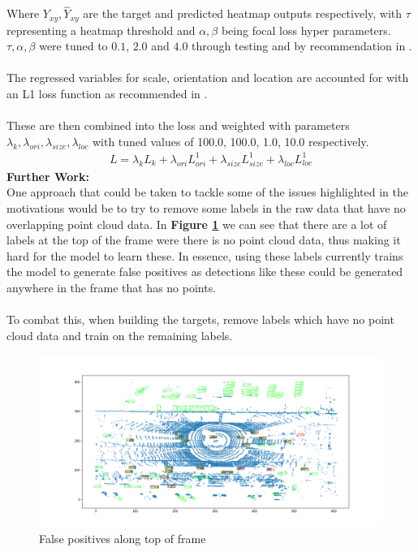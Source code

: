 \documentclass[letter]{article}
\newcommand{\fref}[1]{\textbf{Figure \ref{#1}}}
\begin{document}
	Where $Y_{xy}, \hat{Y}_{xy}$ are the target and predicted heatmap outputs respectively, with $\tau$ representing a heatmap threshold and $\alpha, \beta$ being focal loss hyper parameters. $\tau, \alpha, \beta$ were tuned to $0.1$, $2.0$ and $4.0$ through testing and by recommendation in \cite{objects-as-points}. \\\\
	The regressed variables for scale, orientation and location are accounted for with an L1 loss function as recommended in \cite{objects-as-points}.\\\\
	These are then combined into the loss and weighted with parameters $\lambda_{k}, \lambda_{ori}, \lambda_{size}, \lambda_{loc}$ with tuned values of 100.0, 100.0, 1.0, 10.0 respectively.
	\begin{align}
		L = \lambda_k L_k + \lambda_{ori} L^1_{ori} + \lambda_{size} L^1_{size} + \lambda_{loc} L^1_{loc}
	\end{align}
	\textbf{Further Work:}\\
	One approach that could be taken to tackle some of the issues highlighted in the motivations would be to try to remove some labels in the raw data that have no overlapping point cloud data. In \fref{fig:false-positive} we can see that there are a lot of labels at the top of the frame were there is no point cloud data, thus making it hard for the model to learn these. In essence, using these labels currently trains the model to generate false positives as detections like these could be generated anywhere in the frame that has no points.\\\\
	To combat this, when building the targets, remove labels which have no point cloud data and train on the remaining labels.
	\begin{figure}[h]
		\centering
		\includegraphics[scale=0.35]{images/false-positives.png}
		\caption{False positives along top of frame}
		\label{fig:false-positive}
	\end{figure}
	\newpage
\end{document}
